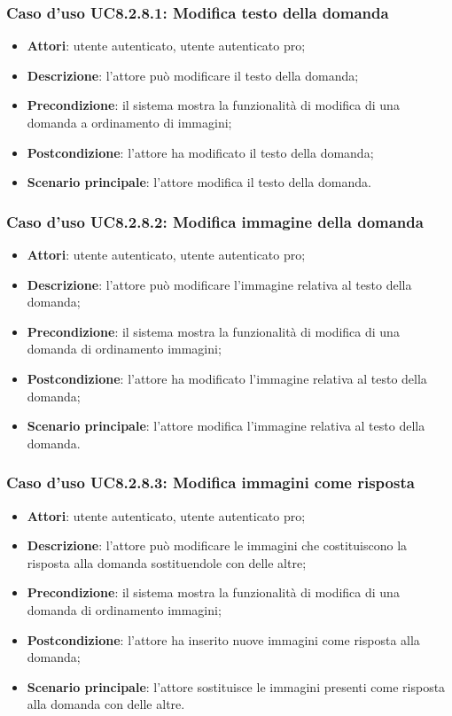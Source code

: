 \subsubsection{Caso d'uso UC8.2.8.1: Modifica testo della domanda}
\begin{itemize}
	\item\textbf{Attori}: utente autenticato, utente autenticato pro;
	\item \textbf{Descrizione}: l'attore può modificare il testo della domanda;
		\item
			\textbf{Precondizione}: il sistema mostra la funzionalità di modifica di una domanda a ordinamento di immagini; 
		\item
			\textbf{Postcondizione}: l'attore ha modificato il testo della domanda;
		\item
			\textbf{Scenario principale}: l'attore modifica il testo della domanda.	
	\end{itemize}

\subsubsection{Caso d'uso UC8.2.8.2: Modifica immagine della domanda}
\begin{itemize}
	\item\textbf{Attori}: utente autenticato, utente autenticato pro;
	\item \textbf{Descrizione}: l'attore può modificare l'immagine relativa al testo della domanda;
		\item
			\textbf{Precondizione}: il sistema mostra la funzionalità di modifica di una domanda di ordinamento immagini; 
		\item
			\textbf{Postcondizione}: l'attore ha modificato l'immagine relativa al testo della domanda;
		\item
			\textbf{Scenario principale}: l'attore modifica l'immagine relativa al testo della domanda. 	
	\end{itemize}

\subsubsection{Caso d'uso UC8.2.8.3: Modifica immagini come risposta}
\begin{itemize}
	\item\textbf{Attori}: utente autenticato, utente autenticato pro;
	\item\textbf{Descrizione}: l'attore può modificare le immagini che costituiscono la risposta alla domanda sostituendole con delle altre;
	\item\textbf{Precondizione}: il sistema mostra la funzionalità di modifica di una domanda di ordinamento immagini;  
	\item \textbf{Postcondizione}: l'attore ha inserito nuove immagini come risposta alla domanda;
	\item\textbf{Scenario principale}: l'attore sostituisce le immagini presenti come risposta alla domanda con delle altre.
\end{itemize}

